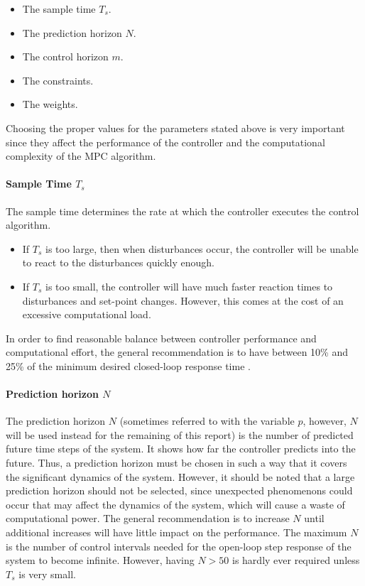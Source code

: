 \documentclass{thesisreport}
\begin{document}
\begin{itemize}
	\item The sample time $T_s$.
	\item The prediction horizon $N$.
	\item The control horizon $m$.
	\item The constraints.
	\item The weights.
\end{itemize}

\noindent Choosing the proper values for the parameters stated above is very important since they affect the performance of the controller and the computational complexity of the MPC algorithm.

\paragraph{Sample Time $T_s$} 

The sample time determines the rate at which the controller executes the control algorithm. \begin{itemize}
	\item If $T_s$ is too large, then when disturbances occur, the controller will be unable to react to the disturbances quickly enough.
	\item If $T_s$ is too small, the controller will have much faster reaction times to disturbances and set-point changes. However, this comes at the cost of an excessive computational load.
\end{itemize}

\noindent In order to find reasonable balance between controller performance and computational effort, the general recommendation is to have between 10\% and 25\% of the minimum desired closed-loop response time .

\paragraph{Prediction horizon $N$} 

The prediction horizon $N$ (sometimes referred to with the variable $p$, however, $N$ will be used instead for the remaining of this report) is the number of predicted future time steps of the system. It shows how far the controller predicts into the future. Thus, a prediction horizon must be chosen in such a way that it covers the significant dynamics of the system. However, it should be noted that a large prediction horizon should not be selected, since unexpected phenomenons could occur that may affect the dynamics of the system, which will cause a waste of computational power. The general recommendation is to increase $N$ until additional increases will have little impact on the performance. The maximum $N$ is the number of control intervals needed for the open-loop step response of the system to become infinite. However, having $N>50$ is hardly ever required unless $T_s$ is very small.
\end{document}
